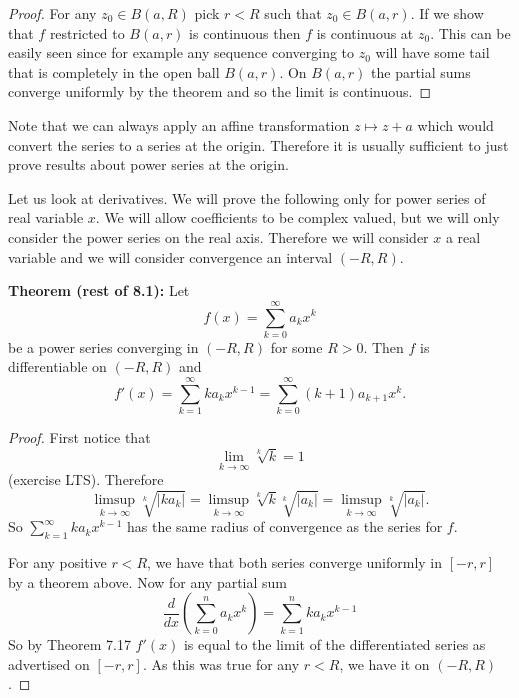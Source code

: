 \documentclass[12pt]{book}
\newcommand{\abs}[1]{\left\lvert {#1} \right\rvert}
\theoremstyle{plain}
\theoremstyle{remark}
\theoremstyle{definition}
\theoremstyle{exercise}
\theoremstyle{example}
\begin{document}
\medskip

\begin{proof}
For any $z_0 \in B(a,R)$ pick $r < R$ such that $z_0 \in B(a,r)$.  If we show
that $f$ restricted to $B(a,r)$ is continuous then $f$ is continuous at
$z_0$.  This can be easily seen since for example any sequence converging to
$z_0$ will have some tail that is completely in the open ball $B(a,r)$.  On $B(a,r)$ the
partial sums converge uniformly by the theorem and so the limit is
continuous.
\end{proof}

\medskip

Note that we can always apply an affine transformation $z \mapsto z+a$ which
would convert the series to a series at the origin.  Therefore it is usually
sufficient to just prove results about power series at the origin.

\medskip

Let us look at derivatives.  We will prove the following only for 
power series of real variable $x$.  We will allow coefficients to be complex valued, but
we will only consider the power series on the real axis.
Therefore we will consider $x$ a real variable and we will consider
convergence an interval $(-R,R)$.

\medskip

\textbf{Theorem (rest of 8.1):}
Let
$$
f(x) = \sum_{k=0}^\infty a_k x^k
$$
be a power series converging in $(-R,R)$ for some $R > 0$.  Then $f$ is
differentiable on $(-R,R)$ and
$$
f'(x) =
\sum_{k=1}^\infty ka_k x^{k-1}
=
\sum_{k=0}^\infty (k+1)a_{k+1} x^{k} .
$$

\medskip

\begin{proof}
First notice that
$$
\lim_{k\to\infty} \sqrt[k]{k}  = 1
$$
(exercise LTS).  Therefore
$$
\limsup_{k\to\infty} \sqrt[k]{\abs{ka_k}} = 
\limsup_{k\to\infty} \sqrt[k]{k} \sqrt[k]{\abs{a_k}} = 
\limsup_{k\to\infty} \sqrt[k]{\abs{a_k}} .
$$
So $\sum_{k=1}^\infty ka_k x^{k-1}$ has the same radius of convergence
as the series for $f$.

For any positive $r < R$, we have that both series converge uniformly
in $[-r,r]$ by a theorem above.  Now for any partial sum
$$
\frac{d}{dx} \left( \sum_{k=0}^n a_k x^k \right)
=
\sum_{k=1}^n k a_k x^{k-1}
$$
So by Theorem 7.17 $f'(x)$ is equal to the limit of the differentiated series
as advertised on $[-r,r]$.  As this was true for any $r < R$, we have it on
$(-R,R)$.
\end{proof}
\end{document}
